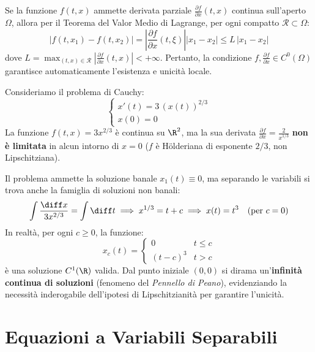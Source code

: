 \begin{osservazione}
Se la funzione $f(t, x)$ ammette derivata parziale $\frac{\partial f}{\partial x}(t, x)$ continua sull'aperto $\Omega$, allora per il Teorema del Valor Medio di Lagrange, per ogni compatto $\mathcal{R} \subset \Omega$:
\[
    |f(t, x_1) - f(t, x_2)| = \left| \frac{\partial f}{\partial x}(t, \xi) \right| |x_1 - x_2| \le L\, |x_1 - x_2|
\]
dove $L = \max_{(t,x) \in \mathcal{R}} \left| \frac{\partial f}{\partial x}(t, x) \right| < +\infty$. Pertanto, la condizione $f, \frac{\partial f}{\partial x} \in C^0(\Omega)$ garantisce automaticamente l'esistenza e unicità locale.
\end{osservazione}

\begin{esame}
Consideriamo il problema di Cauchy:
\[
    \begin{cases}
        x'(t) = 3\, (x(t))^{2/3} \\
        x(0) = 0
    \end{cases}
\]
La funzione $f(t, x) = 3x^{2/3}$ è continua su $\R^2$, ma la sua derivata $\frac{\partial f}{\partial x} = \frac{2}{x^{1/3}}$ \textbf{non è limitata} in alcun intorno di $x = 0$ ($f$ è Hölderiana di esponente $2/3$, non Lipschitziana).

Il problema ammette la soluzione banale $x_1(t) \equiv 0$, ma separando le variabili si trova anche la famiglia di soluzioni non banali:
\[
    \int \frac{\diff x}{3 x^{2/3}} = \int \diff t \implies x^{1/3} = t + c \implies x(t) = t^3 \quad (\text{per } c = 0)
\]
In realtà, per ogni $c \ge 0$, la funzione:
\[
    x_c(t) = \begin{cases} 0 & t \le c \\ (t - c)^3 & t > c \end{cases}
\]
è una soluzione $C^1(\R)$ valida. Dal punto iniziale $(0, 0)$ si dirama un'\textbf{infinità continua di soluzioni} (fenomeno del \emph{Pennello di Peano}), evidenziando la necessità inderogabile dell'ipotesi di Lipschitzianità per garantire l'unicità.
\end{esame}

\newpage

\section{Equazioni a Variabili Separabili}
\label{sec:variabili_separabili}

